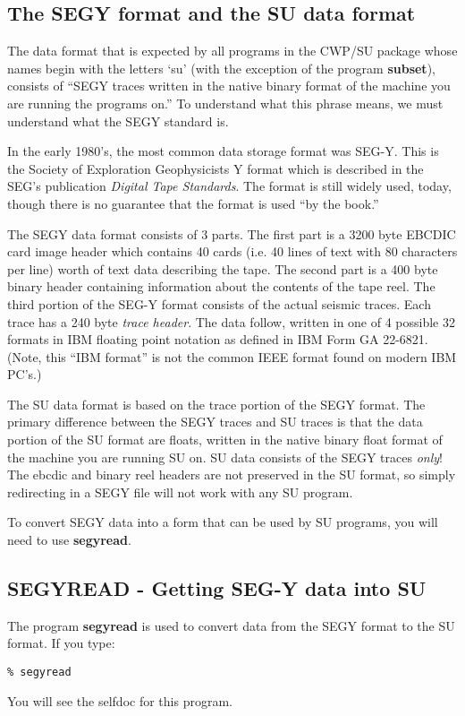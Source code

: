 {{{\subsection{The SEGY format and the SU data format}

The data format that is expected by all programs in the CWP/SU package
whose names begin with the letters `su'  (with the exception of the
program {\bf subset}), consists of ``SEGY traces written in the native
binary format of the machine you are running the programs on.''
To understand what this phrase means, we must understand what the
SEGY standard is.

In the early 1980's, the most common data storage format was SEG-Y.
This is the Society of Exploration Geophysicists Y format which is
described in the SEG's publication {\em Digital Tape Standards\/}.
The format is still widely used, today, though there is no
guarantee that the format is used ``by the book.''

The SEGY data format consists of 3 parts. The first part is a
3200 byte EBCDIC card image header which contains 40 cards
(i.e. 40 lines of text with 80 characters per line) worth of
text data describing the tape.
The second part is a 400 byte binary header containing information
about the contents of the tape reel. The third portion of 
the SEG-Y format consists of the actual seismic traces. Each trace
has a 240 byte {\em trace header\/}. The data follow, written in
one of 4 possible 32 formats in IBM floating point notation
as defined in IBM Form GA 22-6821. (Note, this ``IBM format'' is
not the common IEEE format found on modern IBM PC's.)

The SU data format is based on the trace portion of the SEGY format.
The primary difference between the SEGY traces and SU traces is that
the data portion of the SU format are floats, written in the native
binary float format of the machine you are running SU on. SU data
consists of the SEGY traces {\em only\/}! The ebcdic and binary
reel headers are not preserved in the SU format,
so simply redirecting in a SEGY file will not work with any SU 
program.

To convert SEGY data into a form that can be used by SU programs,
you will need to use {\bf segyread}.


\subsection{SEGYREAD - Getting SEG-Y data into SU}
The program {\bf segyread\/} is used to convert data from the SEGY format
to the SU format.
If you type:
{\small\begin{verbatim}
% segyread
\end{verbatim} }  \noindent
You will see the selfdoc for this program.

}}}
